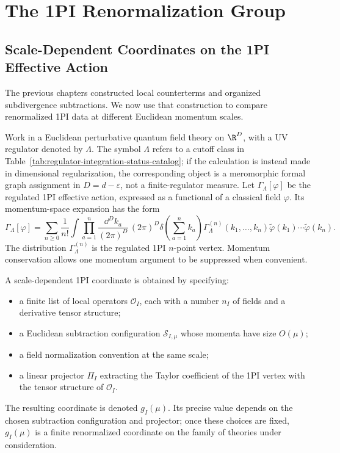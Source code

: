 \chapter{The 1PI Renormalization Group}
\label{ch:volume-ii-1pi-renormalization-group}
\ConventionsEuclidean


\section{Scale-Dependent Coordinates on the 1PI Effective Action}

The previous chapters constructed local counterterms and organized
subdivergence subtractions.  We now use that construction to compare
renormalized 1PI data at different Euclidean momentum scales.

Work in a Euclidean perturbative quantum field theory on \(\R^D\), with a UV
regulator denoted by \(\Lambda\).  The symbol \(\Lambda\) refers to a cutoff
class in Table~\ref{tab:regulator-integration-status-catalog}; if the
calculation is instead made in dimensional regularization, the corresponding
object is a meromorphic formal graph assignment in \(D=d-\varepsilon\), not a
finite-regulator measure.  Let \(\Gamma_\Lambda[\varphi]\) be the regulated
1PI effective action, expressed as a functional of a classical field
\(\varphi\).  Its momentum-space expansion has the form
\[
  \Gamma_\Lambda[\varphi]
  =
  \sum_{n\ge0}\frac1{n!}
  \int
  \prod_{a=1}^n\frac{\dd^D k_a}{(2\pi)^D}\,
  (2\pi)^D\delta\!\left(\sum_{a=1}^n k_a\right)
  \Gamma_\Lambda^{(n)}(k_1,\ldots,k_n)
  \widetilde\varphi(k_1)\cdots\widetilde\varphi(k_n).
\]
The distribution \(\Gamma_\Lambda^{(n)}\) is the regulated 1PI \(n\)-point
vertex.  Momentum conservation allows one momentum argument to be suppressed
when convenient.

A scale-dependent 1PI coordinate is obtained by specifying:
\begin{itemize}
  \item a finite list of local operators \(\mathcal O_I\), each with a number
  \(n_I\) of fields and a derivative tensor structure;
  \item a Euclidean subtraction configuration \(\mathcal S_{I,\mu}\) whose
  momenta have size \(O(\mu)\);
  \item a field normalization convention at the same scale;
  \item a linear projector \(\Pi_I\) extracting the Taylor coefficient of the
  1PI vertex with the tensor structure of \(\mathcal O_I\).
\end{itemize}
The resulting coordinate is denoted \(g_I(\mu)\).  Its precise value depends
on the chosen subtraction configuration and projector; once these choices are
fixed, \(g_I(\mu)\) is a finite renormalized coordinate on the family of
theories under consideration.

